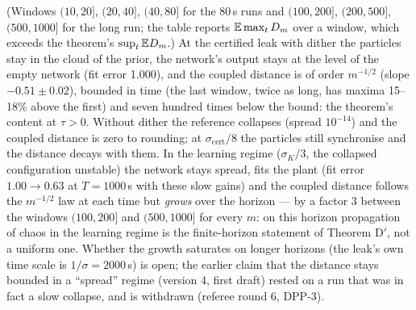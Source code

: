 \noindent(Windows $(10,20]$, $(20,40]$, $(40,80]$ for the 80\,s runs and $(100,200]$, $(200,500]$, $(500,1000]$ for
the long run; the table reports $\mathbb{E}\max_tD_m$ over a window, which exceeds the theorem's $\sup_t\mathbb{E} D_m$.) At the
certified leak with dither the particles stay in the cloud of the prior, the network's output stays at the level of
the empty network (fit error 1.000), and the coupled distance is of order $m^{-1/2}$ (slope $-0.51\pm0.02$), bounded
in time (the last window, twice as long, has maxima 15--18\% above the first) and seven hundred times below the bound:
the theorem's content at $\tau > 0$. Without dither the reference collapses (spread $10^{-14}$) and the coupled
distance is zero to rounding; at $\sigma_{\mathrm{cert}}/8$ the particles still synchronise and the distance decays
with them. In the learning regime ($\sigma_K/3$, the collapsed configuration unstable) the network stays spread, fits
the plant (fit error $1.00\to0.63$ at $T = 1000$\,s with these slow gains) and the coupled distance follows the
$m^{-1/2}$ law at each time but \emph{grows} over the horizon --- by a factor 3 between the windows $(100,200]$ and
$(500,1000]$ for every $m$: on this horizon propagation of chaos in the learning regime is the finite-horizon
statement of Theorem D$'$, not a uniform one. Whether the growth saturates on longer horizons (the leak's own time
scale is $1/\sigma = 2000$\,s) is open; the earlier claim that the distance stays bounded in a ``spread'' regime
(version 4, first draft) rested on a run that was in fact a slow collapse, and is withdrawn (referee round 6, DPP-3).
